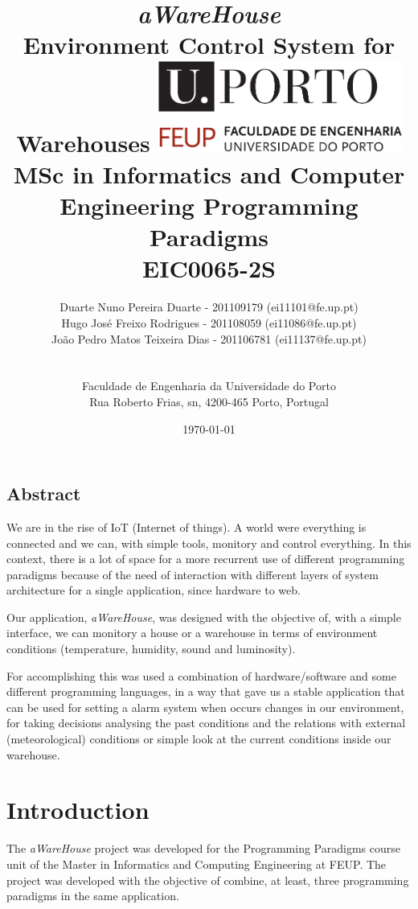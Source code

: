 \documentclass[12pt]{report}
\title{
\huge{\textbf{\textit{aWareHouse}}}\linebreak
\Large\textbf{\\Environment Control System for Warehouses}\linebreak\linebreak\linebreak
\includegraphics[width=8cm]{feup.pdf}\linebreak \linebreak
\large{MSc in Informatics and Computer Engineering} \linebreak
\large{Programming Paradigms \\ EIC0065-2S}\linebreak
}
\author{
Duarte Nuno Pereira Duarte - 201109179 (ei11101@fe.up.pt)\\
Hugo José Freixo Rodrigues - 201108059 (ei11086@fe.up.pt)\\
João Pedro Matos Teixeira Dias - 201106781 (ei11137@fe.up.pt)\\
\\
\\ Faculdade de Engenharia da Universidade do Porto \\ Rua Roberto Frias, s\/n, 4200-465 Porto, Portugal
}
\date{\today}
\begin{document}
\clearpage\maketitle
\thispagestyle{empty}

\newpage
\section*{Abstract}

We are in the rise of IoT (Internet of things). A world were everything is connected and we can, with simple tools, monitory and control everything. In this context, there is a lot of space for a more recurrent use of different programming paradigms because of the need of interaction with different layers of system architecture for a single application, since hardware to web.

Our application, \textit{aWareHouse}, was designed with the objective of, with a simple interface, we can monitory a house or a warehouse in terms of environment conditions (temperature, humidity, sound and luminosity). 

For accomplishing this was used a combination of hardware/software and some different programming languages, in a way that gave us a stable application that can be used for setting a alarm system when occurs changes in our environment, for taking decisions analysing the past conditions and the relations with external (meteorological) conditions or simple look at the current conditions inside our warehouse.


\newpage
\tableofcontents
\newpage

\chapter{Introduction}

The \textit{aWareHouse} project was developed for the Programming Paradigms course unit of the Master in Informatics and Computing Engineering at FEUP. The project was developed with the objective of combine, at least, three programming paradigms in the same application.
\end{document}
